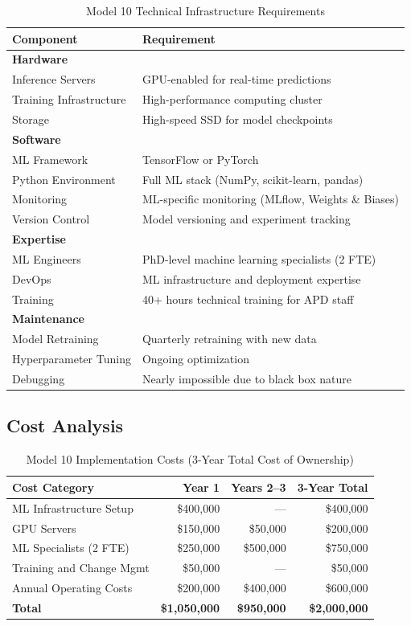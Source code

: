 \begin{table}[h]
\centering
\caption{Model 10 Technical Infrastructure Requirements}
\begin{tabular}{ll}
\toprule
\textbf{Component} & \textbf{Requirement} \\
\midrule
\textbf{Hardware} & \\
Inference Servers & GPU-enabled for real-time predictions \\
Training Infrastructure & High-performance computing cluster \\
Storage & High-speed SSD for model checkpoints \\
\midrule
\textbf{Software} & \\
ML Framework & TensorFlow or PyTorch \\
Python Environment & Full ML stack (NumPy, scikit-learn, pandas) \\
Monitoring & ML-specific monitoring (MLflow, Weights \& Biases) \\
Version Control & Model versioning and experiment tracking \\
\midrule
\textbf{Expertise} & \\
ML Engineers & PhD-level machine learning specialists (2 FTE) \\
DevOps & ML infrastructure and deployment expertise \\
Training & 40+ hours technical training for APD staff \\
\midrule
\textbf{Maintenance} & \\
Model Retraining & Quarterly retraining with new data \\
Hyperparameter Tuning & Ongoing optimization \\
Debugging & Nearly impossible due to black box nature \\
\bottomrule
\end{tabular}
\end{table}

\subsection{Cost Analysis}

\begin{table}[h]
\centering
\caption{Model 10 Implementation Costs (3-Year Total Cost of Ownership)}
\begin{tabular}{lrrr}
\toprule
\textbf{Cost Category} & \textbf{Year 1} & \textbf{Years 2--3} & \textbf{3-Year Total} \\
\midrule
ML Infrastructure Setup & \$400,000 & --- & \$400,000 \\
GPU Servers & \$150,000 & \$50,000 & \$200,000 \\
ML Specialists (2 FTE) & \$250,000 & \$500,000 & \$750,000 \\
Training and Change Mgmt & \$50,000 & --- & \$50,000 \\
Annual Operating Costs & \$200,000 & \$400,000 & \$600,000 \\
\midrule
\textbf{Total} & \textbf{\$1,050,000} & \textbf{\$950,000} & \textbf{\$2,000,000} \\
\bottomrule
\end{tabular}
\end{table}

